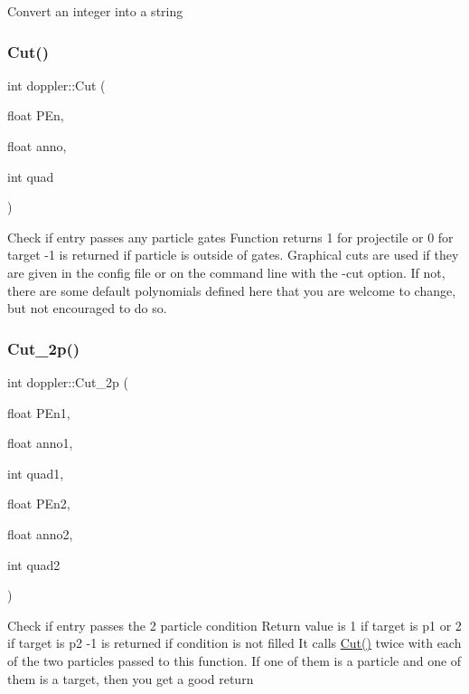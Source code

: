 Convert an integer into a string \mbox{\label{classdoppler_aa3debb227d73f7cdea5b02e4c202cb19}} 
\subsubsection{\texorpdfstring{Cut()}{Cut()}}
{\footnotesize\ttfamily int doppler\+::\+Cut (\begin{DoxyParamCaption}\item[{float}]{P\+En,  }\item[{float}]{anno,  }\item[{int}]{quad }\end{DoxyParamCaption})}

Check if entry passes any particle gates Function returns 1 for projectile or 0 for target -\/1 is returned if particle is outside of gates. Graphical cuts are used if they are given in the config file or on the command line with the -\/cut option. If not, there are some default polynomials defined here that you are welcome to change, but not encouraged to do so. \mbox{\label{classdoppler_a52f116733da78465469a75ced66915a8}} 
\subsubsection{\texorpdfstring{Cut\+\_\+2p()}{Cut\_2p()}}
{\footnotesize\ttfamily int doppler\+::\+Cut\+\_\+2p (\begin{DoxyParamCaption}\item[{float}]{P\+En1,  }\item[{float}]{anno1,  }\item[{int}]{quad1,  }\item[{float}]{P\+En2,  }\item[{float}]{anno2,  }\item[{int}]{quad2 }\end{DoxyParamCaption})}

Check if entry passes the 2 particle condition Return value is 1 if target is p1 or 2 if target is p2 -\/1 is returned if condition is not filled It calls \hyperlink{classdoppler_aa3debb227d73f7cdea5b02e4c202cb19}{Cut()} twice with each of the two particles passed to this function. If one of them is a particle and one of them is a target, then you get a good return \mbox{\label{classdoppler_a56df9f9384f469385458193754c743c9}} 
